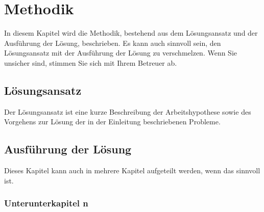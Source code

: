 \chapter{Methodik}\label{ch:approach}

\begin{temp}
In diesem Kapitel wird die Methodik, bestehend aus dem Lösungsansatz und der Ausführung der Lösung, beschrieben.
Es kann auch sinnvoll sein, den Lösungsansatz mit der Ausführung der Lösung zu verschmelzen.
Wenn Sie unsicher sind, stimmen Sie sich mit Ihrem Betreuer ab.

\section{Lösungsansatz}\label{sec:approach}
Der Lösungsansatz ist eine kurze Beschreibung der Arbeitshypothese sowie des Vorgehens zur Lösung der in der Einleitung beschriebenen Probleme.

\section{Ausführung der Lösung}\label{sec:solution}
Dieses Kapitel kann auch in mehrere Kapitel aufgeteilt werden, wenn das sinnvoll ist.

\subsection{Unterunterkapitel n}

\end{temp}
